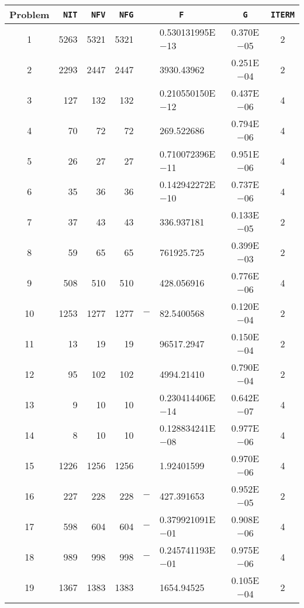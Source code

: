 \documentclass{esub2acm}
\begin{document}
\begin{table}
\footnotesize
\centering
\begin{tabular}{c|rrrr@{}lcc} \hline
Problem\rule[-2pt]{0pt}{12pt}  & {\tt NIT} & {\tt NFV} & {\tt NFG} & \multicolumn{2}{c}{\tt F} & {\tt G} & {\tt ITERM} \\ \hline
1\rule[-2pt]{0pt}{12pt} &   5263    &   5321    &   5321    &       &   0.530131995E$-$13   &   0.370E$-$05 &   2   \\
2   &   2293    &   2447    &   2447    &       &   3930.43962  &   0.251E$-$04 &   2   \\
3   &   127 &   132 &   132 &       &   0.210550150E$-$12   &   0.437E$-$06 &   4   \\
4   &   70  &   72  &   72  &       &   269.522686  &   0.794E$-$06 &   4   \\
5   &   26  &   27  &   27  &       &   0.710072396E$-$11   &   0.951E$-$06 &   4   \\
6   &   35  &   36  &   36  &       &   0.142942272E$-$10   &   0.737E$-$06 &   4   \\
7   &   37  &   43  &   43  &       &   336.937181  &   0.133E$-$05 &   2   \\
8   &   59  &   65  &   65  &       &   761925.725  &   0.399E$-$03 &   2   \\
9   &   508 &   510 &   510 &       &   428.056916  &   0.776E$-$06 &   4   \\
10  &   1253    &   1277    &   1277    &   $-$ &   82.5400568  &   0.120E$-$04 &   2   \\
11  &   13  &   19  &   19  &       &   96517.2947  &   0.150E$-$04 &   2   \\
12  &   95  &   102 &   102 &       &   4994.21410  &   0.790E$-$04 &   2   \\
13  &   9   &   10  &   10  &       &   0.230414406E$-$14   &   0.642E$-$07 &   4   \\
14  &   8   &   10  &   10  &       &   0.128834241E$-$08   &   0.977E$-$06 &   4   \\
15  &   1226    &   1256    &   1256    &       &   1.92401599  &   0.970E$-$06 &   4   \\
16  &   227 &   228 &   228 &   $-$ &   427.391653  &   0.952E$-$05 &   2   \\
17  &   598 &   604 &   604 &   $-$ &   0.379921091E$-$01   &   0.908E$-$06 &   4   \\
18  &   989 &   998 &   998 &   $-$ &   0.245741193E$-$01   &   0.975E$-$06 &   4   \\
19  &   1367    &   1383    &   1383    &       &   1654.94525  &   0.105E$-$04 &   2   \\

\end{tabular}
\end{table}
\end{document}
